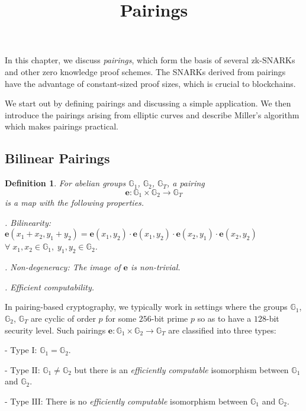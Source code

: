 \documentclass[11pt, lettersize, notitlepage, leqno, footskip=0.6cm]{article}
\newcommand{\lra}{\longrightarrow}
\newcommand{\mb}{\mathbb}
\newcommand{\mr}{\mathrm}
\newtheorem{Def}{Definition}[section]
\numberwithin{equation}{section}
\begin{document}
 
\title{Pairings}
\author{}
\date{}
 
\maketitle


In this chapter, we discuss \textit{pairings}, which form the basis of several zk-SNARKs and other zero knowledge proof schemes. The SNARKs derived from pairings have the advantage of constant-sized proof sizes, which is crucial to blockchains. 

We start out by defining pairings and discussing a simple application. We then introduce the pairings arising from elliptic curves and describe Miller's algorithm which makes pairings practical.


\subsection{\fontsize{11}{11}\selectfont Bilinear Pairings}


\begin{Def} \normalfont For abelian groups $\mb{G}_1$, $\mb{G}_2$, $\mb{G}_T$, a \textit{pairing} $$\mathbf{e}:\mb{G}_1\times \mb{G}_2 \lra \mb{G}_T$$ is a map with the following properties.

. Bilinearity: $\mathbf{e}(x_1+x_2,y_1+y_2) = \mathbf{e}(x_1, y_2)\cdot\mathbf{e}(x_1, y_2)\cdot\mathbf{e}(x_2, y_1)\cdot\mathbf{e}(x_2, y_2)$\\ $\forall\; x_1,x_2\in \mb{G}_1,\; y_1,y_2\in \mb{G}_2$.

. Non-degeneracy: The image of $\mathbf{e}$ is non-trivial.

. Efficient computability.\end{Def}

In pairing-based cryptography, we typically work in settings where the groups $\mb{G}_1$, $\mb{G}_2$, $\mb{G}_T$ are cyclic of order $p$ for some $256$-bit prime $p$ so as to have a $128$-bit security level. Such pairings $\mathbf{e}:\mb{G}_1\times \mb{G}_2 \lra \mb{G}_T$ are classified into three types:

\noindent - Type $\mr{I}$: $\mb{G}_1 = \mb{G}_2$.

\noindent - Type $\mr{II}$: $\mb{G}_1 \neq \mb{G}_2$ but there is an \textit{efficiently computable} isomorphism between $\mb{G}_1$ and $\mb{G}_2$.

\noindent - Type $\mr{III}$: There is no \textit{efficiently computable} isomorphism between $\mb{G}_1$ and $\mb{G}_2$.
\end{document}
